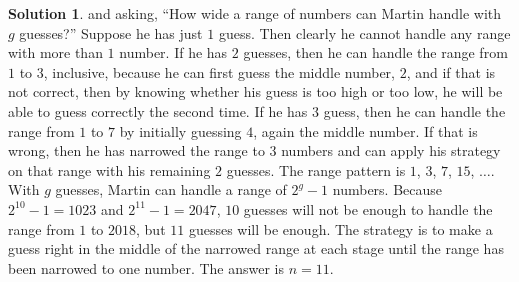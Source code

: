 \documentclass{article}
\theoremstyle{definition}
\newtheorem*{solution}{Solution}
\begin{document}
\begin{multicols}{2}
\begin{enumerate}
\begin{solution}
            and asking, ``How wide a range of numbers can Martin handle with $g$ guesses?''
            Suppose he has just $1$ guess. Then clearly he cannot handle any range with more than $1$ number.
            If he has $2$ guesses, then he can handle the range from $1$ to $3$, inclusive,
            because he can first guess the middle number, $2$, and if that is not correct,
            then by knowing whether his guess is too high or too low, he will be able to guess correctly the second time.
            If he has $3$ guess, then he can handle the range from $1$ to $7$ by initially guessing $4$, again the middle number.
            If that is wrong, then he has narrowed the range to $3$ numbers and can apply his strategy on that range with his remaining $2$ guesses.
            The range pattern is $1$, $3$, $7$, $15$, $\dots$.
            With $g$ guesses, Martin can handle a range of $2^g - 1$ numbers.
            Because $2^{10} - 1 = 1023$ and $2^11 - 1 = 2047$, $10$ guesses will not be enough to handle the range from $1$ to $2018$, but $11$ guesses will be enough.
            The strategy is to make a guess right in the middle of the narrowed range at each stage until the range has been narrowed to one number.
            The answer is $n = 11$.
        \end{solution}
    \end{enumerate}
\end{multicols}
\end{document}
